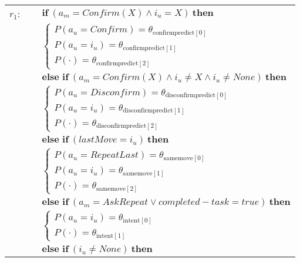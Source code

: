 \begin{footnotesize}
\begin{longtable}{p{2cm}l}
$r_{1}$: \ \ & $ \textbf{if} \ (\mathit{a_m}\!=\!\mathit{Confirm({X})} \land \mathit{i_u}\!=\!\mathit{{X}}) \ \textbf{then} $ \\
 & \;\;\;\;\; $ \begin{cases}P(\mathit{a_u}\!=\!\mathit{Confirm})\!=\!\theta_{\mathrm{confirmpredict[0]}} \\
P(\mathit{a_u}\!=\!\mathit{{i_u}})\!=\!\theta_{\mathrm{confirmpredict[1]}} \\
P(\cdot)\!=\!\theta_{\mathrm{confirmpredict[2]}} \end{cases}$  \vspace{1mm} \\ & $ \textbf{else if} \ (\mathit{a_m}\!=\!\mathit{Confirm({X})} \land \mathit{i_u}\!\neq\!\mathit{{X}} \land \mathit{i_u}\!\neq\!\mathit{None}) \ \textbf{then}$ \\
& \;\;\;\;\; $ \begin{cases}P(\mathit{a_u}\!=\!\mathit{Disconfirm})\!=\!\theta_{\mathrm{disconfirmpredict[0]}} \\
P(\mathit{a_u}\!=\!\mathit{{i_u}})\!=\!\theta_{\mathrm{disconfirmpredict[1]}} \\
P(\cdot)\!=\!\theta_{\mathrm{disconfirmpredict[2]}} \end{cases}$ \vspace{1mm} \\ & $ \textbf{else if} \ (\mathit{lastMove}\!=\!\mathit{{i_u}}) \ \textbf{then}$ \\
& \;\;\;\;\; $ \begin{cases}P(\mathit{a_u}\!=\!\mathit{RepeatLast})\!=\!\theta_{\mathrm{samemove[0]}} \\
P(\mathit{a_u}\!=\!\mathit{{i_u}})\!=\!\theta_{\mathrm{samemove[1]}} \\
P(\cdot)\!=\!\theta_{\mathrm{samemove[2]}} \end{cases}$ \vspace{1mm} \\ & $ \textbf{else if} \ (\mathit{a_m}\!=\!\mathit{AskRepeat} \lor \mathit{completed-task}\!=\!\mathit{true}) \ \textbf{then}$ \\
& \;\;\;\;\; $ \begin{cases}P(\mathit{a_u}\!=\!\mathit{{i_u}})\!=\!\theta_{\mathrm{intent[0]}} \\
P(\cdot)\!=\!\theta_{\mathrm{intent[1]}} \end{cases}$  \vspace{1mm} \\ & $ \textbf{else if} \ (\mathit{i_u}\!\neq\!\mathit{None}) \ \textbf{then}$ \\

\end{longtable}
\end{footnotesize}
